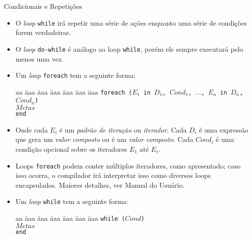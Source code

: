 \begin{frame}{Condicionais e Repetições}
\begin{itemize}
        \item O \textit{loop} \texttt{while} irá repetir uma série de ações enquanto uma 
        série de condições forem verdadeiras.
        
        \item O \textit{loop} \texttt{do-while} é análogo ao loop \texttt{while}, porém ele 
        sempre executará pelo menos uma vez.
        
        \framebreak
        
        \item Um \textit{loop} \texttt{foreach} tem a seguinte forma:
        
        \begin{tabbing}
            aa \= aaa \= aaa \= aaa \= aaa \= aaa \= aaa \kill
            \> \texttt{foreach ($E_1$ in $D_1$, $Cond_1$, $\ldots$, $E_n$ in $D_n$, $Cond_n$)}  \\
            \> \> $Metas$ \\
            \>  \texttt{end} 
        \end{tabbing}
        
        \item Onde cada $E_i$ é um \emph{padrão de iteração} ou \emph{iterador}. Cada $D_i$ é
        uma expressão que gera um \emph{valor composto} ou é um \emph{valor composto}. Cada 
        $Cond_i$ é uma condição opcional sobre os iteradores $E_1$ até $E_i$.
        
        \item Loops \texttt{foreach} podem conter múltiplos iteradores, como apresentado; 
        caso isso ocorra, o compilador irá interpretar isso como diversos loops encapsulados. Maiores detalhes, ver Manual do Usuário. %
        
        
        \framebreak
        
        \item Um \textit{loop} \texttt{while} tem a seguinte forma:
        
        \begin{tabbing}
            aa \= aaa \= aaa \= aaa \= aaa \= aaa \= aaa \kill
            \> \texttt{while ($Cond$)} \\
            \> \> $Metas$  \\
            \>  \texttt{end}
        \end{tabbing} 
        

\end{itemize}
\end{frame}
